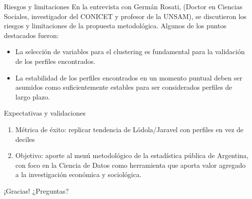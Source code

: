 \documentclass{beamer}
\begin{document}
\begin{frame}{Riesgos y limitaciones}
    \small En la entrevista con Germán Rosati, (Doctor en Ciencias Sociales, investigador del CONICET y profesor de la UNSAM), se discutieron los riesgos y limitaciones de la propuesta metodológica. Algunos de los puntos destacados fueron:
    \normalsize
\begin{itemize}
    \item La selección de variables para el clustering es fundamental para la validación de los perfiles encontrados.
    \item La estabilidad de los perfiles encontrados en un momento puntual deben ser asumidos como suficientemente estables para ser considerados perfiles de largo plazo.
\end{itemize}
\end{frame}

\begin{frame}{Expectativas y validaciones}
\begin{enumerate}
    \item Métrica de éxito: replicar tendencia de Lódola/Jaravel con perfiles en vez de deciles
    \item Objetivo: aporte al menú metodológico de la estadística pública de Argentina, con foco en la Ciencia de Datos como herramienta que aporta valor agregado a la investigación económica y sociológica.
\end{enumerate}
\end{frame}

\begin{frame}{¡Gracias!}
\centering\huge¿Preguntas?
\end{frame}
\end{document}
